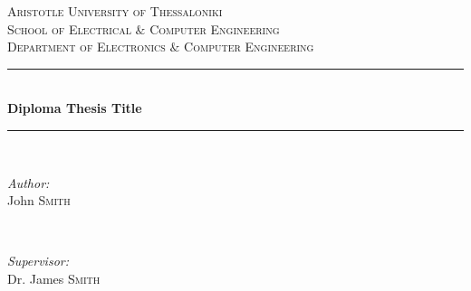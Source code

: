 \begin{titlepage}
    
    \newcommand{\HRule}{\rule{\linewidth}{0.5mm}} %
    
    \center %
     
    
    \textsc{\LARGE Aristotle University of Thessaloniki}\\[1.5cm] %
    \textsc{\Large School of Electrical $\&$ Computer Engineering}\\[0.5cm] %
    \textsc{\large Department of Electronics $\&$ Computer Engineering}\\[0.5cm] %
    
    
    \HRule \\[0.4cm]
    { \huge \bfseries Diploma Thesis Title}\\[0.4cm] %
    \HRule \\[1.5cm]
     
    
    \begin{minipage}{0.4\textwidth}
    \begin{flushleft} \large
    \emph{Author:}\\
    John \textsc{Smith} %
    \end{flushleft}
    \end{minipage}
    ~
    \begin{minipage}{0.4\textwidth}
    \begin{flushright} \large
    \emph{Supervisor:} \\
    Dr. James \textsc{Smith} %
    \end{flushright}
    \end{minipage}\\[2cm]
    

\end{titlepage}
